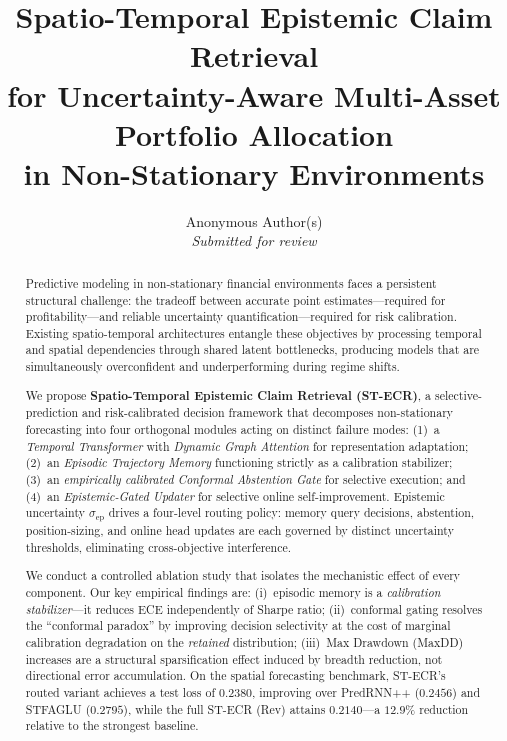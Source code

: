 \documentclass[11pt,a4paper]{article}
\title{%
  \textbf{Spatio-Temporal Epistemic Claim Retrieval}\\[4pt]
  \large for Uncertainty-Aware Multi-Asset Portfolio Allocation\\
  in Non-Stationary Environments
}
\author{%
  Anonymous Author(s)\\[4pt]
  \normalsize \textit{Submitted for review}
}
\date{}
\newcommand{\sep}{\sigma_{\mathrm{ep}}}
\begin{document}
\maketitle
\thispagestyle{empty}

\begin{abstract}
Predictive modeling in non-stationary financial environments faces a persistent
structural challenge: the tradeoff between accurate point estimates—required for
profitability—and reliable uncertainty quantification—required for risk calibration.
Existing spatio-temporal architectures entangle these objectives by processing
temporal and spatial dependencies through shared latent bottlenecks, producing
models that are simultaneously overconfident and underperforming during
regime shifts.

We propose \textbf{Spatio-Temporal Epistemic Claim Retrieval (ST-ECR)}, a
selective-prediction and risk-calibrated decision framework that decomposes
non-stationary forecasting into four orthogonal modules acting on distinct
failure modes: (1)~a \emph{Temporal Transformer} with \emph{Dynamic Graph
Attention} for representation adaptation; (2)~an \emph{Episodic Trajectory
Memory} functioning strictly as a calibration stabilizer; (3)~an
\emph{empirically calibrated Conformal Abstention Gate} for selective execution;
and (4)~an \emph{Epistemic-Gated Updater} for selective online self-improvement.
Epistemic uncertainty $\sep$ drives a four-level routing policy: memory query
decisions, abstention, position-sizing, and online head updates are each governed
by distinct uncertainty thresholds, eliminating cross-objective interference.

We conduct a controlled ablation study that isolates the
mechanistic effect of every component.  Our key empirical findings are:
(i)~episodic memory is a \emph{calibration stabilizer}—it reduces ECE
independently of Sharpe ratio;
(ii)~conformal gating resolves the ``conformal paradox'' by improving decision
selectivity at the cost of marginal calibration degradation on the
\emph{retained} distribution;
(iii)~Max Drawdown (MaxDD) increases are a structural sparsification effect
induced by breadth reduction, not directional error accumulation.
On the spatial forecasting benchmark, ST-ECR's routed variant achieves
a test loss of $0.2380$, improving over PredRNN++ ($0.2456$) and STFAGLU
($0.2795$), while the full ST-ECR (Rev) attains $0.2140$—a $12.9\%$
reduction relative to the strongest baseline.
\end{abstract}
\end{document}
